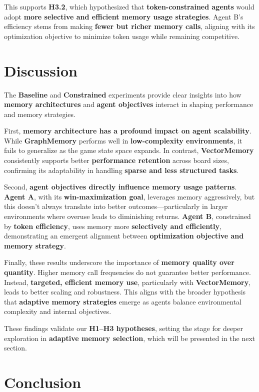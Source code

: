 \documentclass[12pt]{article}
\begin{document}
This supports \textbf{H3.2}, which hypothesized that \textbf{token-constrained agents} would adopt \textbf{more selective and efficient memory usage strategies}. Agent B's efficiency stems from making \textbf{fewer but richer memory calls}, aligning with its optimization objective to minimize token usage while remaining competitive.

\section{Discussion}

The \textbf{Baseline} and \textbf{Constrained} experiments provide clear insights into how \textbf{memory architectures} and \textbf{agent objectives} interact in shaping performance and memory strategies. 

First, \textbf{memory architecture has a profound impact on agent scalability}. While \textbf{GraphMemory} performs well in \textbf{low-complexity environments}, it fails to generalize as the game state space expands. In contrast, \textbf{VectorMemory} consistently supports better \textbf{performance retention} across board sizes, confirming its adaptability in handling \textbf{sparse and less structured tasks}.

Second, \textbf{agent objectives directly influence memory usage patterns}. \textbf{Agent A}, with its \textbf{win-maximization goal}, leverages memory aggressively, but this doesn't always translate into better outcomes—particularly in larger environments where overuse leads to diminishing returns. \textbf{Agent B}, constrained by \textbf{token efficiency}, uses memory more \textbf{selectively and efficiently}, demonstrating an emergent alignment between \textbf{optimization objective and memory strategy}.

Finally, these results underscore the importance of \textbf{memory quality over quantity}. Higher memory call frequencies do not guarantee better performance. Instead, \textbf{targeted, efficient memory use}, particularly with \textbf{VectorMemory}, leads to better scaling and robustness. This aligns with the broader hypothesis that \textbf{adaptive memory strategies} emerge as agents balance environmental complexity and internal objectives.

These findings validate our \textbf{H1–H3 hypotheses}, setting the stage for deeper exploration in \textbf{adaptive memory selection}, which will be presented in the next section.

\section{Conclusion}



\end{document}

